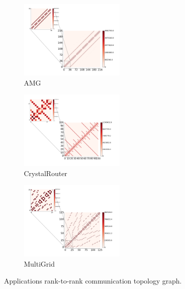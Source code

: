 

\begin{figure}[htp]
    \centering
    \begin{subfigure}[t]{0.32\textwidth}
        \centering
        \includegraphics[height=1.5in]{figs/appstudy/amg/amg_pip}
        \caption{AMG}
        \label{fig:amg-communication-topology}
    \end{subfigure}
    \begin{subfigure}[t]{0.32\textwidth}
        \centering
        \includegraphics[height=1.5in]{figs/appstudy/cr/cr_pip}
        \caption{CrystalRouter}
        \label{fig:cr-communication-topology}
    \end{subfigure}
    \begin{subfigure}[t]{0.32\textwidth}
        \centering
        \includegraphics[height=1.5in]{figs/appstudy/mg/mg_pip}
        \caption{MultiGrid}
        \label{fig:mg-communication-topology}
    \end{subfigure}
    \caption{Applications rank-to-rank communication topology graph.}
    \label{fig:apps_communication_matrix}
\end{figure}


